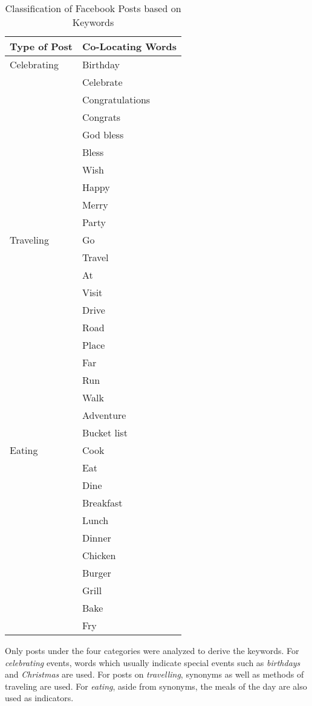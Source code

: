 \clearpage
\begin{table}[ph!]   %
	\centering
	\caption{Classification of Facebook Posts based on Keywords} \vspace{0.25em}
	\begin{tabular}{|p{1.5in}|p{2in}|} \hline
		\centering Type of Post & Co-Locating Words \\ \hline
		Celebrating & 
			 Birthday \\
			 &  Celebrate \\
		 	&Congratulations \\
			 & Congrats \\
			 & God bless \\		
			 & Bless \\
			 & Wish \\
			 & Happy \\
			 & Merry \\
			 & Party \\
		 \hline
		Traveling & 
			 Go \\ 
			 &  Travel \\ 
			 &  At \\
			 &  Visit \\
			 &  Drive \\
			 &  Road \\
			 &  Place \\
			 &  Far \\
			 &  Run \\
			 &  Walk \\
			 &  Adventure \\
			  & Bucket list \\
		 \hline
		Eating & 
			 Cook \\
			 &  Eat \\
			 &  Dine \\
			 &  Breakfast \\
			 &  Lunch \\ 
			 &  Dinner \\
			 &  Chicken \\
			 &  Burger \\
			 &  Grill \\
			 &  Bake \\ 
			 &  Fry \\
		 \hline
	\end{tabular}
	\label{tab:EventClassification}
\end{table}

Only posts under the four categories were analyzed to derive the keywords. For \textit{celebrating} events, words which usually indicate special events such as \textit{birthdays} and \textit{Christmas} are used. For posts on \textit{travelling}, synonyms as well as methods of traveling are used. For \textit{eating}, aside from synonyms, the meals of the day are also used as indicators.

